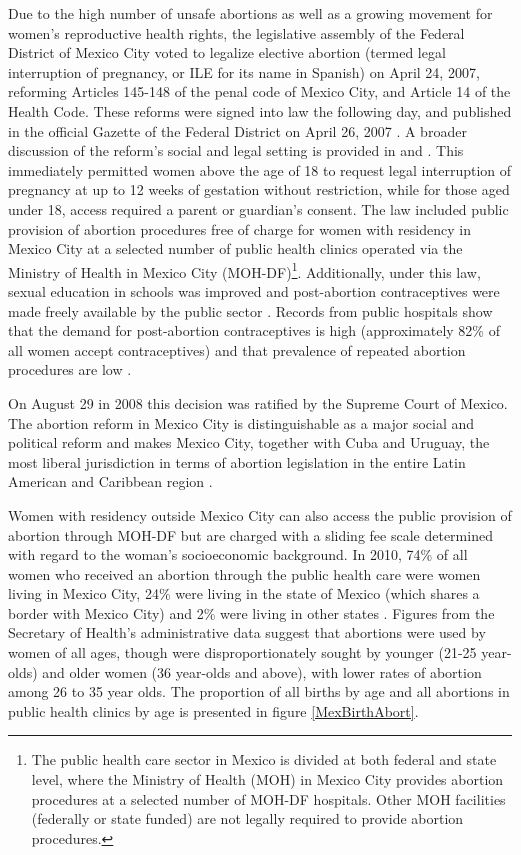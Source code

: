 \documentclass[a4paper, 11pt]{article}
\begin{document}
\begin{spacing}{2}
Due to the high number of unsafe abortions as well as a growing movement for women's reproductive health rights, the legislative assembly of the Federal District of Mexico City voted to legalize elective abortion (termed legal interruption of pregnancy, or ILE for its name in Spanish) on April 24, 2007, reforming Articles 145-148 of the penal code of Mexico City, and Article 14 of the Health Code.  These reforms were signed into law the following day, and published in the official %
 Gazette of the Federal District on April 26, 2007 \citep{Gacetta2007}.  A broader discussion of the reform's social and legal setting is provided in \citet{Kulczycki2011, Madrazo2009} and \citet{Johnson2013}.  This immediately permitted women above the age of 18 to request legal interruption of pregnancy at up to 12 weeks of gestation without restriction, while for those aged under 18, access required a parent or guardian's consent. The law included public provision of abortion procedures free of charge for women with residency in Mexico City at a selected number of public health clinics operated via the Ministry of Health in Mexico City (MOH-DF)\footnote{The public health care sector in Mexico is divided at both federal and state level, where the Ministry of Health (MOH) in Mexico City provides abortion procedures at a selected number of MOH-DF hospitals. Other MOH facilities (federally or state funded) are not legally required to provide abortion procedures.}.  Additionally, under this law, sexual education in schools was improved and post-abortion contraceptives were made freely available by the public sector \citep{Contreras2011}. Records from public hospitals show that the demand for post-abortion contraceptives is high (approximately 82\% of all women accept contraceptives) and that prevalence of repeated abortion procedures are low \citep{Becker2013}.

On August 29 in 2008 this decision was ratified by the Supreme Court of Mexico. The abortion reform in Mexico City is distinguishable as a major social and political reform and makes Mexico City, together with Cuba and Uruguay, the most liberal jurisdiction in terms of abortion legislation in the entire Latin American and Caribbean region \citep{Fraser2015}.

Women with residency outside Mexico City can also access the public provision of abortion through MOH-DF but are charged with a sliding fee scale determined with regard to the woman's socioeconomic background. In 2010, 74\% of all women who received an abortion through the public health care were women living in Mexico City, 24\% were living in the state of Mexico (which shares a border with Mexico City) and 2\% were living in other states \citep{Kalb}.  Figures from the Secretary of Health's administrative data suggest that abortions were used by women of all ages, though were disproportionately sought by younger (21-25 year-olds) and older women (36 year-olds and above), with lower rates of abortion among 26 to 35 year olds.  The proportion of all births by age and all abortions in public health clinics by age is presented in figure \ref{MexBirthAbort}.


\end{spacing}
\end{document}
